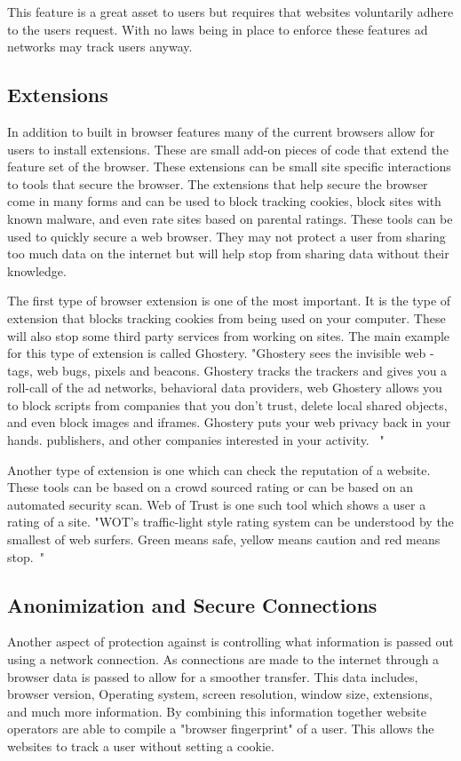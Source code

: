 This feature is a great asset to users but requires that websites voluntarily
adhere to the users request. With no laws being in place to enforce these
features ad networks may track users anyway.

\subsection{Extensions} 
In addition to built in browser features many of the current browsers allow for
users to install extensions. These are small add-on pieces of code that extend
the feature set of the browser. These extensions can be small site specific
interactions to tools that secure the browser. The extensions that help secure
the browser come in many forms and can be used to block tracking cookies, block
sites with known malware, and even rate sites based on parental ratings. These 
tools can be used to quickly secure a web browser. They may not protect a user
from sharing too much data on the internet but will help stop from sharing data
without their knowledge.

The first type of browser extension is one of the most important. It is the type
of extension that blocks tracking cookies from being used on your computer.
These will also stop some third party services from working on sites. The main
example for this type of extension is called Ghostery. "Ghostery sees the
invisible web - tags, web bugs, pixels and beacons. Ghostery tracks the trackers
and gives you a roll-call of the ad networks, behavioral data providers, web
Ghostery allows you to block scripts from companies that you don't trust, delete
local shared objects, and even block images and iframes. Ghostery puts your web 
privacy back in your hands. publishers, and other companies interested in your 
activity. ~\cite{ghost}"

Another type of extension is one which can check the reputation of a
website. These tools can be based on a crowd sourced rating or can be based on
an automated security scan. Web of Trust is one such tool which shows a user a
rating of a site. "WOT’s traffic-light style rating system can be understood by 
the smallest of web surfers. Green means safe, yellow means caution and red 
means stop.~\cite{wot}"

\subsection{Anonimization and Secure Connections} 
Another aspect of protection against is controlling what information is passed
out using a network connection. As connections are made to the internet through
a browser data is passed to allow for a smoother transfer. This data includes,
browser version, Operating system, screen resolution, window size, extensions,
and much more information. By combining this information together website
operators are able to compile a "browser fingerprint" of a user. This allows
the websites to track a user without setting a cookie.

